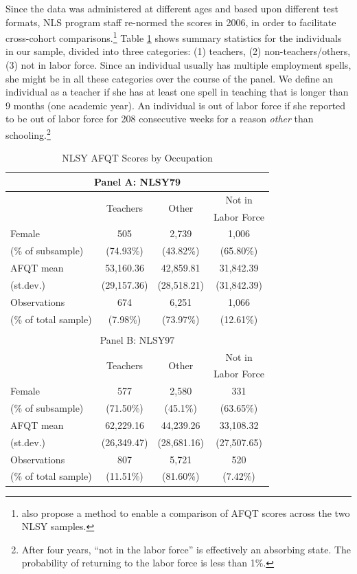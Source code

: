 \documentclass[onehalfspacing,11pt]{article}
\begin{document}
Since the data was administered at different ages and based upon different test formats, NLS program staff re-normed the scores in 2006, in order to facilitate cross-cohort comparisons.\footnote{\cite{Altonji:2009} also propose a method to enable a comparison of AFQT scores across the two NLSY samples.} Table \ref{tab:NLSYscores} shows summary statistics for the individuals in our sample, divided into three categories: (1) teachers, (2) non-teachers/others, (3) not in labor force. Since an individual usually has multiple employment spells, she might be in all these categories over the course of the panel. We define an individual as a teacher if she has at least one spell in teaching that is longer than 9 months (one academic year). An individual is out of labor force if she reported to be out of labor force for 208 consecutive weeks for a reason {\it other} than schooling.\footnote{After four years, ``not in the labor force'' is effectively an absorbing state. The probability of returning to the labor force is less than 1\%.}

	\begin{table}[h!]
		\centering
		\begin{tabular}{lccc}
			\toprule
			\multicolumn{4}{c}{Panel A: NLSY79}\\
			\midrule
			& \multirow{2}{*}{Teachers} & \multirow{2}{*}{Other} & Not in\\
			&  &  & Labor Force\\
			\midrule
			Female & 505 & 2,739 & 1,006 \\
			\quad (\% of subsample) & (74.93\%) & (43.82\%) & (65.80\%)\\
			\midrule
			AFQT mean & 53,160.36 & 42,859.81 & 31,842.39 \\
			\quad (st.dev.) & (29,157.36) & (28,518.21) & (31,842.39) \\
			\midrule
			Observations & 674 & 6,251 & 1,066 \\
			\quad (\% of total sample) & (7.98\%) & (73.97\%) & (12.61\%) \\
			\bottomrule
			\\
			\toprule
			\multicolumn{4}{c}{Panel B: NLSY97}\\
			\midrule
			& \multirow{2}{*}{Teachers} & \multirow{2}{*}{Other} & Not in\\
			&  &  & Labor Force\\
			\midrule
			Female & 577 & 2,580 & 331\\
			\quad (\% of subsample) & (71.50\%) & (45.1\%) & (63.65\%)\\
			\midrule
			AFQT mean & 62,229.16 & 44,239.26 & 33,108.32 \\
			\quad (st.dev.) & (26,349.47) & (28,681.16) & (27,507.65) \\
			\midrule
			Observations & 807 & 5,721 & 520 \\
			\quad (\% of total sample) & (11.51\%) & (81.60\%) & (7.42\%) \\
			\bottomrule
		\end{tabular}
		\caption{NLSY AFQT Scores by Occupation}
		\label{tab:NLSYscores}
	\end{table}
\end{document}
